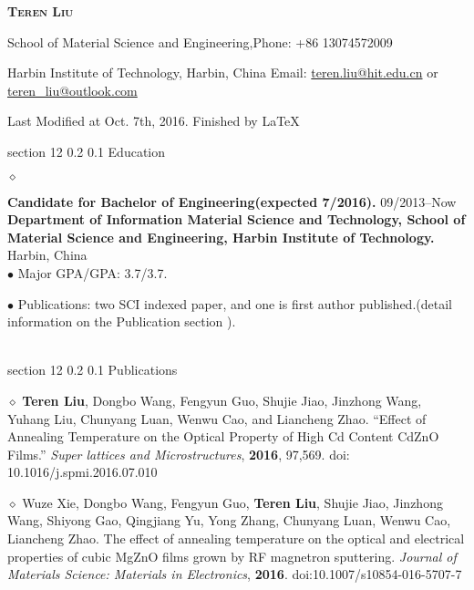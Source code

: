 \documentclass[a4paper]{article}
\makeatletter
\renewcommand{\section}{\@startsection  
{section}  
{12}  
{\z@}  
{0.2\baselineskip}  
{0.1\baselineskip}  
{\normalfont\large\scshape\bfseries}}
\newcommand{\dline} {\vspace{-0.3cm}
\noindent\hrulefill 

}
\newcommand{\cvtitle}[6]
{  
	\begin{flushleft}
	\huge\bfseries\scshape{#1}
	\end{flushleft}  
		\begin{flushleft}
		#2\hfill{#4}
		\end{flushleft}
		\begin{flushleft}
		#3 \hfill{#5}
		\end{flushleft}
		\footnotesize
		#6
		\normalsize 
		\\  
	\vspace{3pt}  
	\dline
}
\newcommand{\entry}[5]
{
	\noindent
	$\diamond$ \parbox[t]{\textwidth}
	{
		 \textbf{{#2}} \small
		 \hfill #1
		 \\ \textbf{#3} \hfill {#4}
	\\#5
	}\\ \normalsize  
}
\makeatother
\begin{document}
\cvtitle{Teren Liu}  
{School of Material Science and Engineering,}%
{Harbin Institute of Technology, Harbin, China} %
{Phone: +86 13074572009}%
{Email: \href{mailto:teren.liu@hit.edu.cn}{teren.liu@hit.edu.cn} or \href{mailto:teren\_ liu@outlook.com}{teren\_liu@outlook.com}} 
{\hfill Last Modified at Oct. 7th, 2016. Finished by \LaTeX} %
\section{Education}
\dline
\entry
 {09/2013--Now}
 {Candidate for Bachelor of Engineering(expected 7/2016).}
  {Department of Information Material Science and Technology, School of Material Science and Engineering, Harbin Institute of Technology.}{Harbin, China}
 {
 $\bullet$ Major GPA/GPA: 3.7/3.7.
 
 $\bullet$ Publications: two SCI indexed paper, and one is first author published.(detail information on the Publication section ).
} %
\normalsize
\section{Publications}
\dline
\noindent $\diamond$ \textbf{Teren Liu}, Dongbo Wang, Fengyun Guo, Shujie Jiao, Jinzhong Wang, Yuhang Liu, Chunyang Luan, Wenwu Cao, and Liancheng Zhao. {“Effect of Annealing Temperature on the Optical Property of High Cd Content CdZnO Films.”} \emph{Super lattices and Microstructures}, \textbf{2016}, 97,569. doi: 10.1016/j.spmi.2016.07.010

\noindent $\diamond$ Wuze Xie, Dongbo Wang, Fengyun Guo, \textbf{Teren Liu}, Shujie Jiao, Jinzhong Wang, Shiyong Gao, Qingjiang Yu, Yong Zhang, Chunyang Luan, Wenwu Cao, Liancheng Zhao. The effect of annealing temperature on the optical and electrical properties of cubic MgZnO films grown by RF magnetron sputtering. \emph{Journal of Materials Science: Materials in Electronics}, \textbf{2016}. doi:10.1007/s10854-016-5707-7
\end{document}
